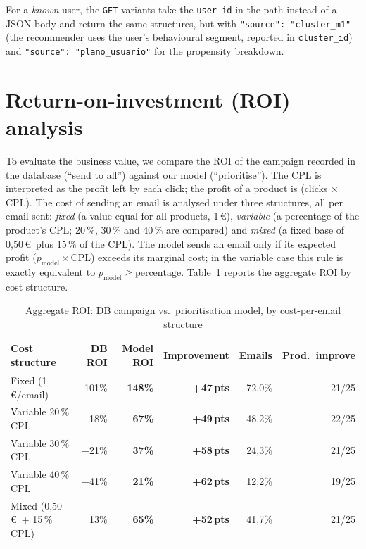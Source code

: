 For a \emph{known} user, the \texttt{GET} variants take the \texttt{user\_id} in the path instead of a JSON body and return the same structures, but with \texttt{"source": "cluster\_m1"} (the recommender uses the user's behavioural segment, reported in \texttt{cluster\_id}) and \texttt{"source": "plano\_usuario"} for the propensity breakdown.

\section{Return-on-investment (ROI) analysis}
\label{sec:roi}

To evaluate the business value, we compare the ROI of the campaign recorded in the database
(``send to all'') against our model (``prioritise''). The CPL is interpreted as the profit
left by each click; the profit of a product is (clicks $\times$ CPL). The cost of sending an email is
analysed under three structures, all per email sent: \emph{fixed} (a value equal for all
products, 1\,\euro), \emph{variable} (a percentage of the product's CPL; 20\,\%, 30\,\% and
40\,\% are compared) and \emph{mixed} (a fixed base of 0,50\,\euro\ plus 15\,\% of the CPL). The model sends an email only
if its expected profit ($p_\text{model}\times\text{CPL}$) exceeds its marginal cost; in the variable case
this rule is exactly equivalent to $p_\text{model}\ge\text{percentage}$. Table~\ref{tab:roi_producto} reports the aggregate ROI by cost structure.

\begin{table}[htbp]
\centering
\caption{Aggregate ROI: DB campaign vs.\ prioritisation model, by cost-per-email structure}
\label{tab:roi_producto}
\small
\begin{tabular}{lrrrrr}
\toprule
\textbf{Cost structure} & \textbf{DB ROI} & \textbf{Model ROI} & \textbf{Improvement} & \textbf{Emails} & \textbf{Prod.\ improve} \\
\midrule
Fixed (1\,\euro/email)        &    101\% & \textbf{148\%} & \textbf{+47\,pts} & 72,0\% & 21/25 \\
Variable 20\,\% CPL           &     18\% & \textbf{67\%}  & \textbf{+49\,pts} & 48,2\% & 22/25 \\
Variable 30\,\% CPL           & $-$21\%  & \textbf{37\%}  & \textbf{+58\,pts} & 24,3\% & 21/25 \\
Variable 40\,\% CPL           & $-$41\%  & \textbf{21\%}  & \textbf{+62\,pts} & 12,2\% & 19/25 \\
Mixed (0,50\,\euro\ + 15\,\% CPL) & 13\% & \textbf{65\%}  & \textbf{+52\,pts} & 41,7\% & 21/25 \\
\bottomrule
\end{tabular}
\end{table}

